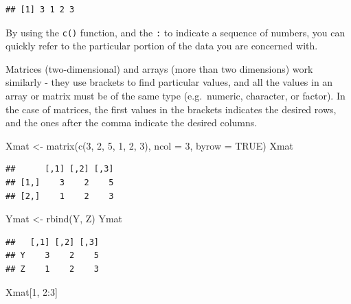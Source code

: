 \documentclass[
]{book}
\newenvironment{Shaded}{\begin{snugshade}}{\end{snugshade}}
\newcommand{\AttributeTok}[1]{\textcolor[rgb]{0.77,0.63,0.00}{#1}}
\newcommand{\ConstantTok}[1]{\textcolor[rgb]{0.00,0.00,0.00}{#1}}
\newcommand{\DecValTok}[1]{\textcolor[rgb]{0.00,0.00,0.81}{#1}}
\newcommand{\FunctionTok}[1]{\textcolor[rgb]{0.00,0.00,0.00}{#1}}
\newcommand{\NormalTok}[1]{#1}
\newcommand{\OtherTok}[1]{\textcolor[rgb]{0.56,0.35,0.01}{#1}}
\newcommand{\SpecialCharTok}[1]{\textcolor[rgb]{0.00,0.00,0.00}{#1}}
\begin{document}
\begin{verbatim}
## [1] 3 1 2 3
\end{verbatim}

By using the \texttt{c()} function, and the \texttt{:} to indicate a sequence of numbers, you can quickly refer to the particular portion of the data you are concerned with.

Matrices (two-dimensional) and arrays (more than two dimensions) work similarly - they use brackets to find particular values, and all the values in an array or matrix must be of the same type (e.g.~numeric, character, or factor). In the case of matrices, the first values in the brackets indicates the desired rows, and the ones after the comma indicate the desired columns.

\begin{Shaded}
\begin{Highlighting}[]
\NormalTok{Xmat }\OtherTok{\textless{}{-}} \FunctionTok{matrix}\NormalTok{(}\FunctionTok{c}\NormalTok{(}\DecValTok{3}\NormalTok{, }\DecValTok{2}\NormalTok{, }\DecValTok{5}\NormalTok{, }\DecValTok{1}\NormalTok{, }\DecValTok{2}\NormalTok{, }\DecValTok{3}\NormalTok{), }
               \AttributeTok{ncol =} \DecValTok{3}\NormalTok{, }\AttributeTok{byrow =} \ConstantTok{TRUE}\NormalTok{)}
\NormalTok{Xmat}
\end{Highlighting}
\end{Shaded}

\begin{verbatim}
##      [,1] [,2] [,3]
## [1,]    3    2    5
## [2,]    1    2    3
\end{verbatim}

\begin{Shaded}
\begin{Highlighting}[]
\NormalTok{Ymat }\OtherTok{\textless{}{-}} \FunctionTok{rbind}\NormalTok{(Y, Z)}
\NormalTok{Ymat}
\end{Highlighting}
\end{Shaded}

\begin{verbatim}
##   [,1] [,2] [,3]
## Y    3    2    5
## Z    1    2    3
\end{verbatim}

\begin{Shaded}
\begin{Highlighting}[]
\NormalTok{Xmat[}\DecValTok{1}\NormalTok{, }\DecValTok{2}\SpecialCharTok{:}\DecValTok{3}\NormalTok{]}
\end{Highlighting}
\end{Shaded}
\end{document}
